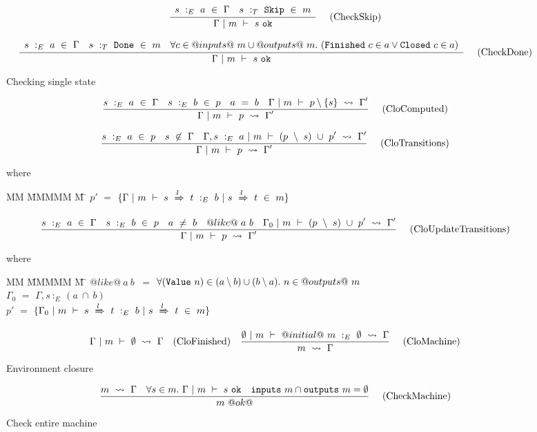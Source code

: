 \begin{figure*}
$$
\frac {\displaystyle 
    \begin{array}{lr}
        s~:_E~ a ~\in~ \Gamma                &
        s ~:_T~ \mathtt{Skip} ~\in~m
    \end{array}
} {\displaystyle  
    \Gamma ~|~ m ~\vdash~ s~\mathtt{ok}
} \ 
\quad
\textrm{(CheckSkip)}
$$

$$
\frac {\displaystyle 
    \begin{array}{lcr}
        s~:_E~ a ~\in~ \Gamma                &
        s ~:_T~ \mathtt{Done} ~\in~m    &
        \forall c \in @inputs@~m \cup @outputs@~m.~(\mathtt{Finished}~c \in a \vee \mathtt{Closed}~c \in a)
    \end{array}
} {\displaystyle  
    \Gamma ~|~ m ~\vdash~ s~\mathtt{ok}
} \ 
\quad
\textrm{(CheckDone)}
$$

\caption{Checking single state}
\label{fig:inv:checking}
\end{figure*}

\begin{figure*}

$$
\frac {\displaystyle 
    s~:_E~ a ~\in~ \Gamma
    \quad
    s~:_E~b~\in~p
    \quad
    a~=~b
    \quad
    \Gamma ~|~ m ~\vdash~ p \setminus \{s\} ~\rightsquigarrow~ \Gamma'
} {\displaystyle 
    \Gamma ~|~ m ~\vdash~ p ~\rightsquigarrow~ \Gamma'
} \ 
\quad
\textrm{(CloComputed)}
$$

$$
\frac {\displaystyle 
    s~:_E~a~\in~p
    \quad
    s~\not\in~\Gamma
    \quad
    \Gamma,s~:_E~a ~|~ m ~\vdash~ (p~\setminus~s)~\cup~ p'  ~\rightsquigarrow~ \Gamma'
} {\displaystyle 
    \Gamma ~|~ m ~\vdash~ p ~\rightsquigarrow~ \Gamma'
} \ 
\quad
\textrm{(CloTransitions)}
$$

where
\begin{tabbing}
MM \= MMMMM \= M \= \kill
\> $p'$ \> $=$ \> $ \{ \Gamma ~|~ m ~\vdash~ s~\xRightarrow{l}~t ~:_E~ b ~|~ s~\xRightarrow{l}~ t~\in~ m\} $
\end{tabbing}


$$
\frac {\displaystyle 
    s~:_E~ a ~\in~ \Gamma
    \quad
    s~:_E~b~\in~p
    \quad
    a~\not=~b
    \quad
    @like@~a~b
    \quad
    \Gamma_0 ~|~ m ~\vdash~ (p~\setminus~s)~\cup~p' ~\rightsquigarrow~ \Gamma'
} {\displaystyle 
    \Gamma ~|~ m ~\vdash~ p ~\rightsquigarrow~ \Gamma'
} \ 
\quad
\textrm{(CloUpdateTransitions)}
$$

where
\begin{tabbing}
MM \= MMMMM \= M \= \kill
\> $@like@~a~b~$ \> $=$ \>
    $\forall(\mathtt{Value}~n) \in (a \setminus b) \cup (b \setminus a).~ n \in @outputs@~m$
\\
\> $\Gamma_0$ \> $=$ $\Gamma, s~:_E~(a~\cap~b)$ \\
\> $p'$ \> $=$ \> $\{ \Gamma_0 ~|~ m ~\vdash~ s~\xRightarrow{l}~t ~:_E~ b ~|~ s~\xRightarrow{l}~ t~\in~ m\}$
\end{tabbing}


$$
\Gamma ~|~ m ~\vdash~ \emptyset ~\rightsquigarrow~ \Gamma
\quad
\textrm{(CloFinished)}
\quad
\frac {\displaystyle 
    \emptyset ~|~ m ~\vdash~ @initial@~m~:_E~\emptyset ~\rightsquigarrow~ \Gamma
} {\displaystyle 
    m ~\rightsquigarrow~ \Gamma
} \ 
\quad
\textrm{(CloMachine)}
$$

\caption{Environment closure}
\label{fig:inv:closure}
\end{figure*}


\begin{figure*}

$$
\frac {\displaystyle 
    m ~\rightsquigarrow~ \Gamma
    \quad
    \forall s \in m.\ \Gamma ~|~ m ~\vdash~ s~\mathtt{ok}
    \quad
    \mathtt{inputs}~m \cap \mathtt{outputs}~m = \emptyset
} {\displaystyle 
    m~@ok@
} \ 
\quad
\textrm{(CheckMachine)}
$$


\caption{Check entire machine}
\label{fig:inv:entire}
\end{figure*}

